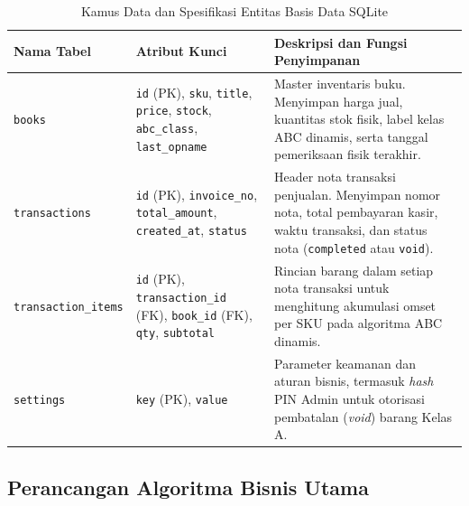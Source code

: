\documentclass[11pt, a4paper]{article}
\begin{document}
\begin{table}[!htbp]
\centering
\caption{Kamus Data dan Spesifikasi Entitas Basis Data SQLite}
\label{tab:skema_basis_data}
\small
\renewcommand{\arraystretch}{1.2}
\begin{tabularx}{\textwidth}{@{} >{\raggedright\arraybackslash}p{2.6cm} >{\raggedright\arraybackslash}p{3.6cm} >{\raggedright\arraybackslash}X @{}}
\toprule
\textbf{Nama Tabel} & \textbf{Atribut Kunci} & \textbf{Deskripsi dan Fungsi Penyimpanan} \\
\midrule
\texttt{books} & \texttt{id} (PK), \texttt{sku}, \texttt{title}, \texttt{price}, \texttt{stock}, \texttt{abc\_}\allowbreak\texttt{class}, \texttt{last\_}\allowbreak\texttt{opname} & Master inventaris buku. Menyimpan harga jual, kuantitas stok fisik, label kelas ABC dinamis, serta tanggal pemeriksaan fisik terakhir. \\ \addlinespace[0.3em]
\texttt{transactions} & \texttt{id} (PK), \texttt{invoice\_}\allowbreak\texttt{no}, \texttt{total\_}\allowbreak\texttt{amount}, \texttt{created\_}\allowbreak\texttt{at}, \texttt{status} & Header nota transaksi penjualan. Menyimpan nomor nota, total pembayaran kasir, waktu transaksi, dan status nota (\texttt{completed} atau \texttt{void}). \\ \addlinespace[0.3em]
\texttt{transaction\_items} & \texttt{id} (PK), \texttt{transaction\_}\allowbreak\texttt{id} (FK), \texttt{book\_}\allowbreak\texttt{id} (FK), \texttt{qty}, \texttt{subtotal} & Rincian barang dalam setiap nota transaksi untuk menghitung akumulasi omset per SKU pada algoritma ABC dinamis. \\ \addlinespace[0.3em]
\texttt{settings} & \texttt{key} (PK), \texttt{value} & Parameter keamanan dan aturan bisnis, termasuk \textit{hash} PIN Admin untuk otorisasi pembatalan (\textit{void}) barang Kelas A. \\
\bottomrule
\end{tabularx}
\end{table}

\subsection{Perancangan Algoritma Bisnis Utama}
\end{document}
